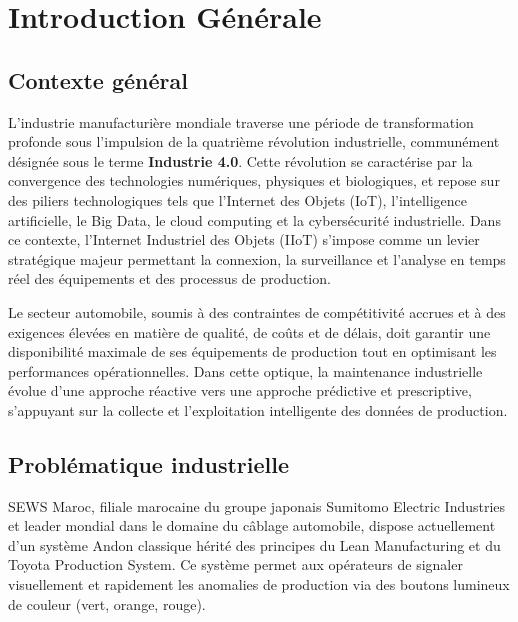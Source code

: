 ﻿%
\chapter*{Introduction Générale}

\section*{Contexte général}

L'industrie manufacturière mondiale traverse une période de transformation profonde sous l'impulsion de la quatrième révolution industrielle, communément désignée sous le terme \textbf{Industrie 4.0}. Cette révolution se caractérise par la convergence des technologies numériques, physiques et biologiques, et repose sur des piliers technologiques tels que l'Internet des Objets (IoT), l'intelligence artificielle, le Big Data, le cloud computing et la cybersécurité industrielle. Dans ce contexte, l'Internet Industriel des Objets (IIoT) s'impose comme un levier stratégique majeur permettant la connexion, la surveillance et l'analyse en temps réel des équipements et des processus de production.

Le secteur automobile, soumis à des contraintes de compétitivité accrues et à des exigences élevées en matière de qualité, de coûts et de délais, doit garantir une disponibilité maximale de ses équipements de production tout en optimisant les performances opérationnelles. Dans cette optique, la maintenance industrielle évolue d'une approche réactive vers une approche prédictive et prescriptive, s'appuyant sur la collecte et l'exploitation intelligente des données de production.

\section*{Problématique industrielle}

SEWS Maroc, filiale marocaine du groupe japonais Sumitomo Electric Industries et leader mondial dans le domaine du câblage automobile, dispose actuellement d'un système Andon classique hérité des principes du Lean Manufacturing et du Toyota Production System. Ce système permet aux opérateurs de signaler visuellement et rapidement les anomalies de production via des boutons lumineux de couleur (vert, orange, rouge).

